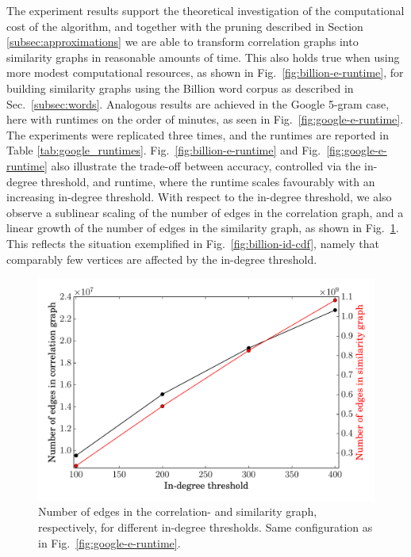 \documentclass[conference]{IEEEtran}
\begin{document}
The experiment results support the theoretical investigation of the computational
cost of the algorithm, and together with the pruning
described in Section \ref{subsec:approximations} we are able to transform correlation graphs into similarity
graphs in reasonable amounts of time. This also holds true when using more modest computational resources,
as shown in Fig.\ \ref{fig:billion-e-runtime}, for building similarity graphs using the Billion word corpus as described
in Sec.\ \ref{subsec:words}. Analogous results are achieved in the Google 5-gram case, here with runtimes on the order of minutes,
as seen in Fig.\ \ref{fig:google-e-runtime}. The experiments were replicated three times, and
the runtimes are reported in Table \ref{tab:google_runtimes}.
Fig.\ \ref{fig:billion-e-runtime} and Fig.\ \ref{fig:google-e-runtime} also illustrate the trade-off between accuracy, controlled
via the in-degree threshold, and runtime, where the runtime scales favourably with an increasing in-degree threshold.
With respect to the in-degree threshold, we also observe a sublinear scaling of the number of edges in the correlation
graph, and a linear growth of the number of  edges in the similarity graph,  as shown in Fig.\ \ref{fig:google-ne}. This reflects the
situation exemplified in Fig.\ \ref{fig:billion-id-cdf}, namely that comparably few vertices are affected by the in-degree threshold.

\begin{figure}
\begin{centering}
\includegraphics[width=0.95\columnwidth]{figures/eng-all-edge-low-e3-vtx-low-e8-high-e1-100-400-idg-ne-nt.pdf}
\end{centering}
\caption{Number of edges in the correlation- and similarity graph, respectively, for different in-degree thresholds. Same 
configuration as in Fig.\ \ref{fig:google-e-runtime}.}
\label{fig:google-ne}
\end{figure}
\end{document}
